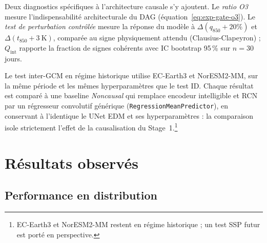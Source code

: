 \documentclass[14pt,a4paper,openany]{extreport}
\begin{document}
Deux diagnostics spécifiques à l'architecture causale s'y ajoutent. Le \emph{ratio O3} mesure l'indispensabilité architecturale du DAG (équation~\ref{eq:exp-gate-o3}). Le \emph{test de perturbation contrôlée} mesure la réponse du modèle à $\Delta(q_{850} +20\%)$ et $\Delta(t_{850} +3~\mathrm{K})$, comparée au signe physiquement attendu (Clausius-Clapeyron) ; $Q_{\mathrm{int}}$ rapporte la fraction de signes cohérents avec IC bootstrap 95\,\% sur $n=30$ jours.

Le test inter-GCM en régime historique utilise EC-Earth3 et NorESM2-MM, sur la même période et les mêmes hyperparamètres que le test ID. Chaque résultat est comparé à une baseline \emph{Noncausal} qui remplace encodeur intelligible et RCN par un régresseur convolutif générique (\texttt{RegressionMeanPredictor}), en conservant à l'identique le UNet EDM et ses hyperparamètres : la comparaison isole strictement l'effet de la causalisation du Stage~1.\footnote{EC-Earth3 et NorESM2-MM restent en régime historique ; un test SSP futur est porté en perspective.}

\section{Résultats observés}
\label{sec:exp-resultats}

\subsection{Performance en distribution}
\label{ssec:exp-res-id}
\end{document}
